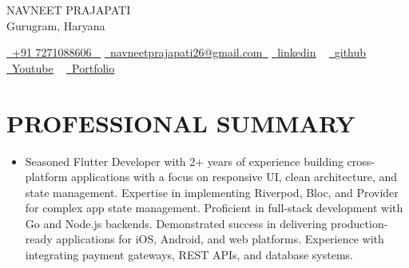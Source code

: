 \documentclass[letterpaper,11pt]{article}
\newcommand{\resumeItem}[1]{
  \item\small{
    {#1 \vspace{-2pt}}
  }
}
\newcommand{\resumeItemListStart}{\begin{itemize}}
\newcommand{\resumeItemListEnd}{\end{itemize}\vspace{-5pt}}
\begin{document}


\begin{center}
    {\Huge \scshape NAVNEET PRAJAPATI} \\ \vspace{1pt}
    Gurugram, Haryana \\ \vspace{1pt}
    \small 
    
    \href{tel:+91 7271088606}{ \raisebox{-0.1\height}\faPhone\ \underline{+91 7271088606} ~} \href{navneetprajapati26@gmail.com}{\raisebox{-0.2\height}\faEnvelope\  \underline{navneetprajapati26@gmail.com}~}
    \href{https://www.linkedin.com/in/navneetprajapati26/}{\raisebox{-0.2\height}\faLinkedin\ \underline{linkedin}} ~
    \href{https://github.com/navneetprajapati26}{\raisebox{-0.2\height}\faGithub\ \underline{github}} ~
    \href{https://www.youtube.com/@asyncapp}{\raisebox{-0.2\height}\faYoutube\ \underline{Youtube}} ~
    \href{https://navneet.asyncapps.com/}{\raisebox{-0.2\height}\faGlobe\ \underline{Portfolio}}
    
    \vspace{-5pt}
\end{center}

\section{PROFESSIONAL SUMMARY}
\resumeItemListStart
\resumeItem{\normalsize{Seasoned Flutter Developer with 2+ years of experience building cross-platform applications with a focus on responsive UI, clean architecture, and state management. Expertise in implementing Riverpod, Bloc, and Provider for complex app state management. Proficient in full-stack development with Go and Node.js backends. Demonstrated success in delivering production-ready applications for iOS, Android, and web platforms. Experience with integrating payment gateways, REST APIs, and database systems.}}
\resumeItemListEnd

\end{document}
